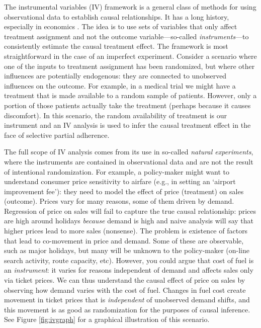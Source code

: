 \documentclass[12pt]{article}
\begin{document}
The instrumental variables (IV) framework is a general class of methods for using observational data to establish causal
relationships.  It has a long history, especially in economics   \citep[e.g.,][]{wright28,reiersol45}. The idea is to use sets of variables that only affect treatment
assignment and not the outcome variable---so-called \emph{instruments}---to consistently estimate the causal treatment effect.  
The framework is most straightforward in the case of an imperfect experiment.  Consider a scenario where one of the inputs to treatment assignment has been  randomized, but where other influences  are potentially  endogenous: they are connected to unobserved influences on the outcome.  For example, in a medical trial we might have a treatment that is made available to a random sample of patients. However, only a portion of those patients actually take the treatment (perhaps because it causes discomfort).  In this scenario, the random availability of treatment is our instrument and an IV analysis is used to infer the causal treatment effect in the face of  selective partial adherence.

The full scope of IV analysis comes from its use in so-called {\it natural experiments}, where the instruments are contained in observational data and are not the result of intentional randomization.  For example, a policy-maker might want to understand consumer price sensitivity to airfare (e.g., in setting an `airport improvement fee'): they need to model the effect of price (treatment) on sales (outcome). Prices vary for many reasons, some of them driven by demand. Regression of price on sales will fail to capture the true causal relationship: prices are high around holidays {\it because} demand is high and naive analysis will say that higher prices lead to more sales (nonsense).  The problem is existence of factors that lead to co-movement in price and demand. Some of these are observable, such as major holidays, but many will be unknown to the policy-maker (on-line search activity, route capacity, etc).  
However, you could argue that cost of fuel is an {\it instrument}: it varies for reasons independent of demand and affects sales only via ticket prices. We can thus understand the causal effect of price on sales by observing how demand varies with the cost of fuel.  Changes in fuel cost create movement in ticket prices that is {\it independent} of unobserved demand shifts, and this movement is as good as randomization for the purposes of causal inference.  See Figure \ref{fig:ivgraph} for a graphical illustration of this scenario.
\end{document}
